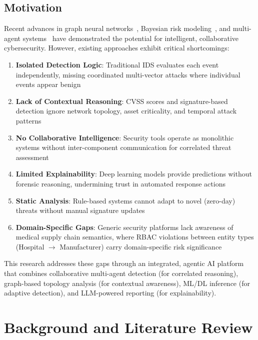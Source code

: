 \documentclass[12pt, a4paper]{report}
\begin{document}
\section{Motivation}

Recent advances in graph neural networks~\cite{jmal2023}, Bayesian risk modeling~\cite{chen2024}, and multi-agent systems~\cite{francois2025} have demonstrated the potential for intelligent, collaborative cybersecurity. However, existing approaches exhibit critical shortcomings:

\begin{enumerate}
    \item \textbf{Isolated Detection Logic}: Traditional IDS evaluates each event independently, missing coordinated multi-vector attacks where individual events appear benign
    \item \textbf{Lack of Contextual Reasoning}: CVSS scores and signature-based detection ignore network topology, asset criticality, and temporal attack patterns
    \item \textbf{No Collaborative Intelligence}: Security tools operate as monolithic systems without inter-component communication for correlated threat assessment
    \item \textbf{Limited Explainability}: Deep learning models provide predictions without forensic reasoning, undermining trust in automated response actions
    \item \textbf{Static Analysis}: Rule-based systems cannot adapt to novel (zero-day) threats without manual signature updates
    \item \textbf{Domain-Specific Gaps}: Generic security platforms lack awareness of medical supply chain semantics, where RBAC violations between entity types (Hospital $\rightarrow$ Manufacturer) carry domain-specific risk significance
\end{enumerate}

This research addresses these gaps through an integrated, agentic AI platform that combines collaborative multi-agent detection (for correlated reasoning), graph-based topology analysis (for contextual awareness), ML/DL inference (for adaptive detection), and LLM-powered reporting (for explainability).


\chapter{Background and Literature Review}
\end{document}
